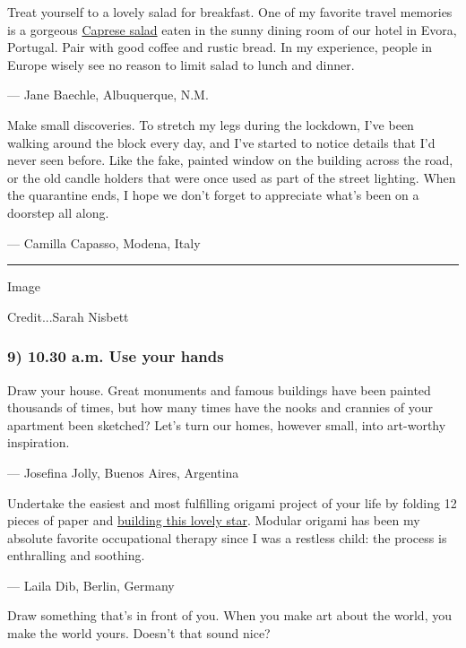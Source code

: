 Treat yourself to a lovely salad for breakfast. One of my favorite
travel memories is a gorgeous
\href{https://cooking.nytimes3xbfgragh.onion/recipes/1018849-classic-caprese-salad}{Caprese
salad} eaten in the sunny dining room of our hotel in Evora, Portugal.
Pair with good coffee and rustic bread. In my experience, people in
Europe wisely see no reason to limit salad to lunch and dinner.

--- Jane Baechle, Albuquerque, N.M.

Make small discoveries. To stretch my legs during the lockdown, I've
been walking around the block every day, and I've started to notice
details that I'd never seen before. Like the fake, painted window on the
building across the road, or the old candle holders that were once used
as part of the street lighting. When the quarantine ends, I hope we
don't forget to appreciate what's been on a doorstep all along.

--- Camilla Capasso, Modena, Italy

\begin{center}\rule{0.5\linewidth}{\linethickness}\end{center}

Image

Credit...Sarah Nisbett

\hypertarget{9-1030-am-use-your-hands}{%
\subsubsection{\texorpdfstring{\textbf{9) 10.30 a.m. Use your
hands}}{9) 10.30 a.m. Use your hands}}\label{9-1030-am-use-your-hands}}

Draw your house. Great monuments and famous buildings have been painted
thousands of times, but how many times have the nooks and crannies of
your apartment been sketched? Let's turn our homes, however small, into
art-worthy inspiration.

--- Josefina Jolly, Buenos Aires, Argentina

Undertake the easiest and most fulfilling origami project of your life
by folding 12 pieces of paper and
\href{https://www.origami-resource-center.com/sonobe-stellated-octahedron.html}{building
this lovely star}. Modular origami has been my absolute favorite
occupational therapy since I was a restless child: the process is
enthralling and soothing.

--- Laila Dib, Berlin, Germany

Draw something that's in front of you. When you make art about the
world, you make the world yours. Doesn't that sound nice?

